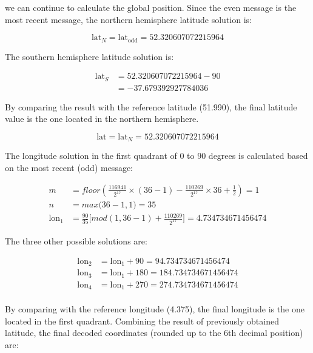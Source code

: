 we can continue to calculate the global position. Since the even message is the most recent message, the northern hemisphere latitude solution is:

\begin{equation}
  \mathrm{lat}_N = \mathrm{lat}_\mathrm{odd} = 52.320607072215964
\end{equation}


The southern hemisphere latitude solution is:

\begin{equation}
  \begin{split}
    \mathrm{lat}_S &= 52.320607072215964 - 90 \\
    &= -37.679392927784036
  \end{split}
\end{equation}
  
By comparing the result with the reference latitude (51.990), the final latitude value is the one located in the northern hemisphere.

\begin{equation}
    \mathrm{lat} = \mathrm{lat}_N = 52.320607072215964
\end{equation}
  

The longitude solution in the first quadrant of 0 to 90 degrees is calculated based on the most recent (odd) message:

\begin{align}
  m &= floor \left( \frac{116941}{2^{17}} \times (36-1) - \frac{110269}{2^{17}} \times 36 + \frac{1}{2}  \right) = 1\\
  n &= max \Big( 36-1, 1 \Big) = 35\\
    \mathrm{lon}_1 &= \frac{90}{35} \Big[ mod(1, 36-1) + \frac{110269}{2^{17}} \Big] = 4.734734671456474
\end{align}

The three other possible solutions are:

\begin{equation}
\begin{split}
    \mathrm{lon}_2 &= \mathrm{lon}_1 + 90 = 94.734734671456474 \\
    \mathrm{lon}_3 &= \mathrm{lon}_1 + 180 = 184.734734671456474 \\
    \mathrm{lon}_4 &= \mathrm{lon}_1 + 270 = 274.734734671456474 \\
\end{split}
\end{equation}

By comparing with the reference longitude (4.375), the final longitude is the one located in the first quadrant. Combining the result of previously obtained latitude, the final decoded coordinates (rounded up to the 6th decimal position) are:



